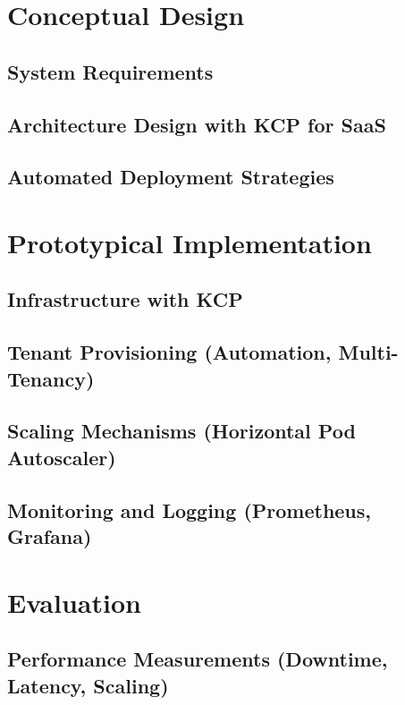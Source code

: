 \documentclass[11pt, a4paper, oneside, draft]{scrartcl}
\begin{document}
    \section{Conceptual Design}

        \subsection{System Requirements}

        \subsection{Architecture Design with KCP for SaaS}

        \subsection{Automated Deployment Strategies}

    \section{Prototypical Implementation}

        \subsection{Infrastructure with KCP}

        \subsection[Tenant Provisioning]{Tenant Provisioning (Automation, Multi-Tenancy)}

        \subsection[Scaling Mechanisms]{Scaling Mechanisms (Horizontal Pod Autoscaler)}

        \subsection[Monitoring and Logging]{Monitoring and Logging (Prometheus, Grafana)}

    \section{Evaluation}

        \subsection[Performance Measurements]{Performance Measurements (Downtime, Latency, Scaling)}
\end{document}
